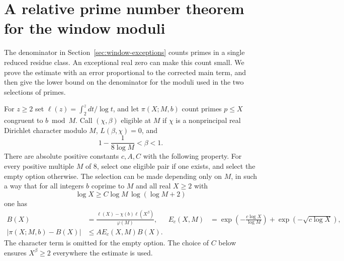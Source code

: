 \section{A relative prime number theorem for the window moduli}
\label{sec:window-relative-pnt}

The denominator in Section~\ref{sec:window-exceptions} counts primes
in a single reduced residue class. An exceptional real zero can make
this count small. We prove the estimate with an error proportional to
the corrected main term, and then give the lower bound on the
denominator for the moduli used in the two selections of primes.

For \(z\ge2\) set
\(\ell(z)=\int_2^z dt/\log t\), and let \(\pi(X;M,b)\) count primes
\(p\le X\) congruent to \(b\bmod M\). Call \((\chi,\beta)\) eligible
at \(M\) if \(\chi\) is a nonprincipal real Dirichlet character modulo
\(M\), \(L(\beta,\chi)=0\), and
\[
       1-\frac{1}{8\log M}<\beta<1.
\]
There are absolute positive constants \(c,A,C\) with the following
property. For every positive multiple \(M\) of \(8\), select one
eligible pair if one exists, and select the empty option otherwise.
The selection can be made depending only on \(M\), in such a way that
for all integers \(b\) coprime to \(M\) and all real \(X\ge2\) with
\[
             \log X\ge C\log M\,\log(\log M+2)
\]
one has
\begin{align}
 B(X)&=\frac{\ell(X)-\chi(b)\ell(X^\beta)}{\varphi(M)},&
 E_c(X,M)&=\exp\!\left(-\frac{c\log X}{\log M}\right)
                   +\exp\!\left(-\sqrt{c\log X}\right),
 \nonumber\\
 |\pi(X;M,b)-B(X)|&\le A E_c(X,M) B(X).
 \label{eq:window-relative-pnt}
\end{align}
The character term is omitted for the empty option. The choice of
\(C\) below ensures \(X^\beta\ge2\) everywhere the estimate is used.

